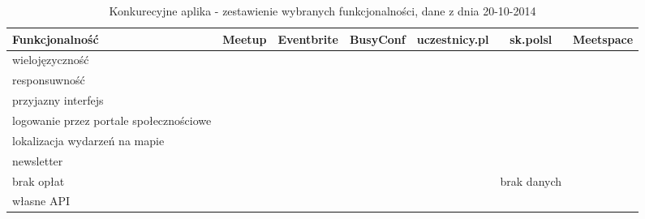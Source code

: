 \newcommand{\cmark}{\ding{51}}
\newcommand{\xmark}{\ding{55}}

\begin{landscape}
  \begin{table}[h]
    \begin{tabular}{|l|c|c|c|c|c|c|}
      \hline
      Funkcjonalność                          & Meetup & Eventbrite & BusyConf & uczestnicy.pl & sk.polsl    & \textbf{Meetspace} \\ \hline
      wielojęzyczność                         & \cmark & \cmark     & \xmark   & \xmark        & \xmark      & \cmark             \\ \hline
      responsuwność                           & \xmark & \cmark     & \cmark   & \cmark        & \xmark      & \cmark             \\ \hline
      przyjazny interfejs                     & \cmark & \cmark     & \cmark   & \xmark        & \xmark      & \cmark             \\ \hline
      logowanie przez portale społecznościowe & \cmark & \xmark     & \xmark   & \cmark        & \xmark      & \cmark             \\ \hline
      lokalizacja wydarzeń na mapie           & \xmark & \cmark     & \cmark   & \cmark        & \xmark      & \cmark             \\ \hline
      newsletter                              & \cmark & \xmark     & \xmark   & \xmark        & \xmark      & \cmark             \\ \hline
      brak opłat                              & \xmark & \cmark     & \xmark   & \xmark        & brak danych & \cmark             \\ \hline
      własne API                              & \cmark & \xmark     & \xmark   & \xmark        & \xmark      & \cmark             \\ \hline
    \end{tabular}
    \caption{Konkurecyjne aplika - zestawienie wybranych funkcjonalności, dane z dnia 20-10-2014}
  \end{table}
\end{landscape}
